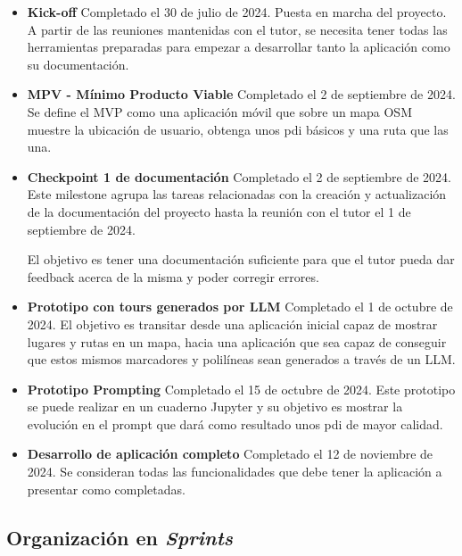 \begin{itemize}

    \item \textbf{Kick-off} Completado el 30 de julio de 2024. Puesta en marcha del proyecto. A partir de las reuniones mantenidas con el tutor, se necesita tener todas las herramientas preparadas para empezar a desarrollar tanto la aplicación como su documentación.
    
    \item \textbf{MPV - Mínimo Producto Viable} Completado el 2 de septiembre de 2024. Se define el MVP como una aplicación móvil que sobre un mapa OSM muestre la ubicación de usuario, obtenga unos \acrshort{pdi} básicos y una ruta que las una.

    \item \textbf{Checkpoint 1 de documentación} Completado el 2 de septiembre de 2024. Este milestone agrupa las tareas relacionadas con la creación y actualización de la documentación del proyecto hasta la reunión con el tutor el 1 de septiembre de 2024.

    El objetivo es tener una documentación suficiente para que el tutor pueda dar feedback acerca de la misma y poder corregir errores.

    \item \textbf{Prototipo con tours generados por LLM} Completado el 1 de octubre de 2024. El objetivo es transitar desde una aplicación inicial capaz de mostrar lugares y rutas en un mapa, hacia una aplicación que sea capaz de conseguir que estos mismos marcadores y polilíneas sean generados a través de un LLM. \label{hito:prototipo_llm}
    
    \item \textbf{Prototipo Prompting} Completado el 15 de octubre de 2024. Este prototipo se puede realizar en un cuaderno Jupyter y su objetivo es mostrar la evolución en el prompt que dará como resultado unos \acrshort{pdi} de mayor calidad.
    
    \item \textbf{Desarrollo de aplicación completo} Completado el 12 de noviembre de 2024. Se consideran todas las funcionalidades que debe tener la aplicación a presentar como completadas.
    
\end{itemize}

\subsection{Organización en \textit{Sprints}}

